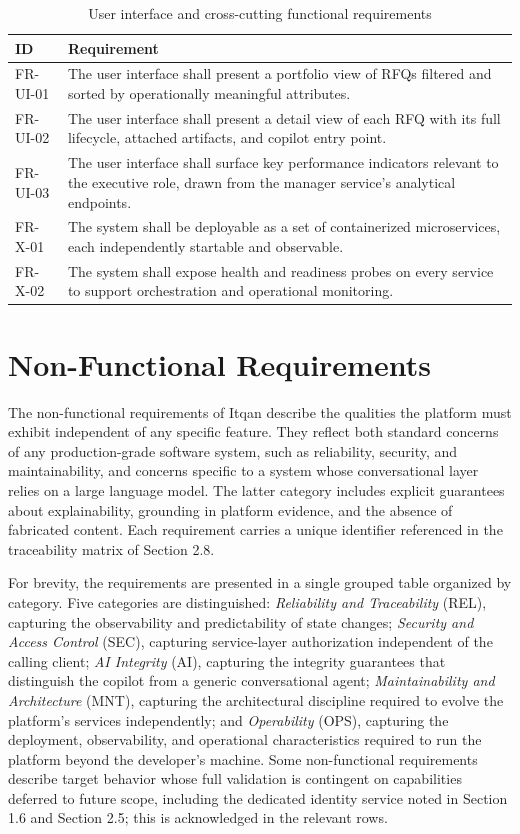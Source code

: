 \begin{table}[H]
\centering
\renewcommand{\arraystretch}{1.3}
\begin{tabular}{|p{1.8cm}|p{12cm}|}
\hline
\rowcolor{lightgray}
\textbf{ID} & \textbf{Requirement} \\ \hline
FR-UI-01 & The user interface shall present a portfolio view of RFQs filtered and sorted by operationally meaningful attributes. \\ \hline
FR-UI-02 & The user interface shall present a detail view of each RFQ with its full lifecycle, attached artifacts, and copilot entry point. \\ \hline
FR-UI-03 & The user interface shall surface key performance indicators relevant to the executive role, drawn from the manager service's analytical endpoints. \\ \hline
FR-X-01 & The system shall be deployable as a set of containerized microservices, each independently startable and observable. \\ \hline
FR-X-02 & The system shall expose health and readiness probes on every service to support orchestration and operational monitoring. \\ \hline
\end{tabular}
\caption{User interface and cross-cutting functional requirements}
\label{tab:fr_ui_cross}
\end{table}

\section{Non-Functional Requirements}
The non-functional requirements of Itqan describe the qualities the platform must exhibit independent of any specific feature. They reflect both standard concerns of any production-grade software system, such as reliability, security, and maintainability, and concerns specific to a system whose conversational layer relies on a large language model. The latter category includes explicit guarantees about explainability, grounding in platform evidence, and the absence of fabricated content. Each requirement carries a unique identifier referenced in the traceability matrix of Section 2.8.

For brevity, the requirements are presented in a single grouped table organized by category. Five categories are distinguished: \textit{Reliability and Traceability} (REL), capturing the observability and predictability of state changes; \textit{Security and Access Control} (SEC), capturing service-layer authorization independent of the calling client; \textit{AI Integrity} (AI), capturing the integrity guarantees that distinguish the copilot from a generic conversational agent; \textit{Maintainability and Architecture} (MNT), capturing the architectural discipline required to evolve the platform's services independently; and \textit{Operability} (OPS), capturing the deployment, observability, and operational characteristics required to run the platform beyond the developer's machine. Some non-functional requirements describe target behavior whose full validation is contingent on capabilities deferred to future scope, including the dedicated identity service noted in Section 1.6 and Section 2.5; this is acknowledged in the relevant rows.

